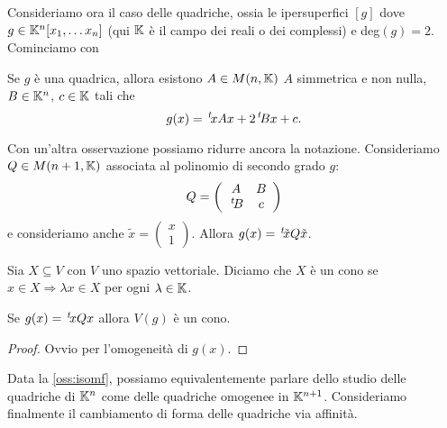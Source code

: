 Consideriamo ora il caso delle quadriche, ossia le ipersuperfici $[g]$ dove $g\in \mathbb K^n[x_1,\dots x_n]$
(qui $\mathbb K$ è il campo dei reali o dei complessi) e deg$(g)=2$. Cominciamo con
\begin{remark}
	Se $g$ è una quadrica, allora esistono $A\in M(n,\mathbb K)$ $A$ simmetrica e non nulla, $B\in \mathbb K^n$, $c\in \mathbb K$ tali che
	\[
		g(x) = \, ^{t}\!xAx+2\, ^{t}\!Bx+c.
	\]
\end{remark}

\begin{remark}\label{oss:isomf}
	Con un'altra osservazione possiamo ridurre ancora la notazione. Consideriamo $Q\in M(n+1,\mathbb K)$ associata al polinomio di secondo grado $g$:
	\[
		Q=\left(
			\begin{array}{cc}
			A & B\\
			\, ^{t}\!B & c
			\end{array}
		\right)
	\]
	e consideriamo anche $\tilde{x} =\left(\begin{smallmatrix}
x \\
1
\end{smallmatrix}
\right)$. Allora $g(x)=\, ^{t}\!\tilde{x}Q\tilde{x}$.
\end{remark}

\begin{definition}[Cono]
	Sia $X\subseteq V$ con $V$ uno spazio vettoriale. Diciamo che $X$ è un cono se $x\in X\Rightarrow \lambda x\in X$ per ogni $\lambda \in \mathbb K$.
\end{definition}
\begin{lemma}
	Se $g(x)=\, ^{t}\!xQx$ allora $V(g)$ è un cono.
\end{lemma}
\begin{proof}
	Ovvio per l'omogeneità di $g(x)$.
\end{proof}

Data la \cref{oss:isomf}, possiamo equivalentemente parlare dello studio delle quadriche di $\mathbb K^n$ come delle quadriche omogenee in $\mathbb K^{n+1}$.
Consideriamo finalmente il cambiamento di forma delle  quadriche via affinità.

